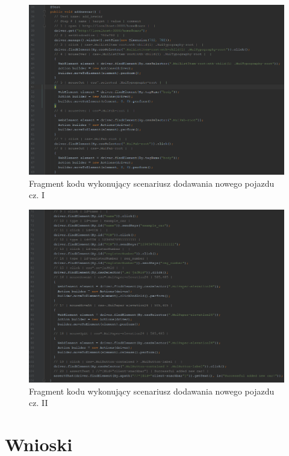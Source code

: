 \documentclass[12pt]{article}
\begin{document}
	 \begin{figure}[H]
		\centering
		\includegraphics[scale=0.70]{testCode1.png}
		\caption{Fragment kodu wykonujący scenariusz dodawania nowego pojazdu cz. I}
		\label{testCode1}
	\end{figure}
	
	
	 \begin{figure}[H]
		\centering
		\includegraphics[scale=0.70]{testCode2.png}
		\caption{Fragment kodu wykonujący scenariusz dodawania nowego pojazdu cz. II}
		\label{testCode2}
	\end{figure}
	
	
\newpage
\section{Wnioski}
\end{document}
